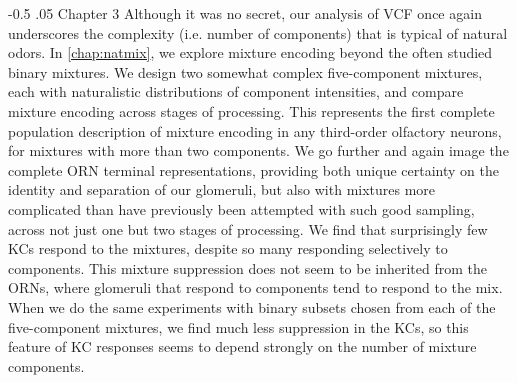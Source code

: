 \documentclass[12pt]{caltech_thesis}
\makeatletter
\renewcommand\paragraph{%
    \@startsection{paragraph}{4}{0mm}%
       {-0.5\baselineskip}%
       {.05\baselineskip}%
       {\normalfont\normalsize\itshape}}
\newcounter{susis}
\newcommand{\hypertargetd}[2]{%
  {\refstepcounter{susis}\label{susistarget#1}}%
  \ifcsname r@susislink#1\endcsname
  \hypertarget{#1}{#2}%
  \else
  \fbox{\textcolor{red}{#2}}%
  \fi
  }%
\newcommand{\hypertargetd}{\hypertarget}
\newcommand*\my@refwithbackref[2]{%
  \edef\my@brlabel{\my@br@parent{#2}}%
  \expandafter\my@br@explicitcall\expandafter{\my@brlabel}%
  \hypertargetd{numback:\my@brlabel}{#1{#2}}%
}
\newcommand*\refwithbackref{\my@refwithbackref\ref}
\makeatother
\begin{document}
\begin{refsection}
\paragraph{Chapter 3}
Although it was no secret, our analysis of VCF once again underscores the complexity (i.e. number of components) that is typical of natural odors.
In \autoref{chap:natmix}, we explore mixture encoding beyond the often studied binary mixtures.
We design two somewhat complex five-component mixtures, each with naturalistic distributions of component intensities, and compare mixture encoding across stages of processing.
This represents the first complete population description of mixture encoding in any third-order olfactory neurons, for mixtures with more than two components.
We go further and again image the complete ORN terminal representations, providing both unique certainty on the identity and separation of our glomeruli, but also with mixtures more complicated than have previously been attempted with such good sampling, across not just one but two stages of processing.
We find that surprisingly few KCs respond to the mixtures, despite so many responding selectively to components.
This mixture suppression does not seem to be inherited from the ORNs, where glomeruli that respond to components tend to respond to the mix.
When we do the same experiments with binary subsets chosen from each of the five-component mixtures, we find much less suppression in the KCs, so this feature of KC responses seems to depend strongly on the number of mixture components.



\processdelayedfloats

\ReferencesSection
\end{refsection}
\end{document}
